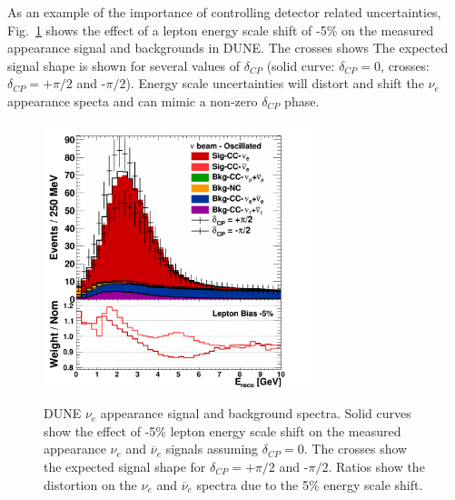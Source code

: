 As an example of the importance of controlling detector related uncertainties,
Fig.~\ref{fig:spectraleffect} shows the effect of a lepton energy scale 
shift of -5\% on the measured 
appearance signal %
 and backgrounds in DUNE. 
The crosses shows 
The expected signal shape is shown for several values of $\delta_{CP}$
(solid curve: $\delta_{CP}=0$, crosses: $\delta_{CP}=+\pi/2$ and -$\pi/2$). 
Energy scale uncertainties will distort and shift the $\nu_e$ appearance specta and
can mimic a non-zero
$\delta_{CP}$ phase.
\begin{figure}[h!]
\centering
\includegraphics[width=0.7\textwidth,height=7.7cm]{figures/CSPP_LeptonBias_nue_app_FHC}
\label{fig:spectraleffect}
  \caption{DUNE $\nu_e$ appearance signal and background spectra. 
Solid curves show the effect of -5\% lepton energy scale shift on the 
measured appearance $\nu_e$ and $\overline{\nu}_e$ signals assuming $\delta_{CP}=0$.
The crosses show the expected signal shape for $\delta_{CP}=+\pi/2$ and -$\pi/2$. 
Ratios show the distortion on the $\nu_e$ and $\overline{\nu}_e$ spectra due to the 
5\% energy scale shift. 
}
\end{figure}


